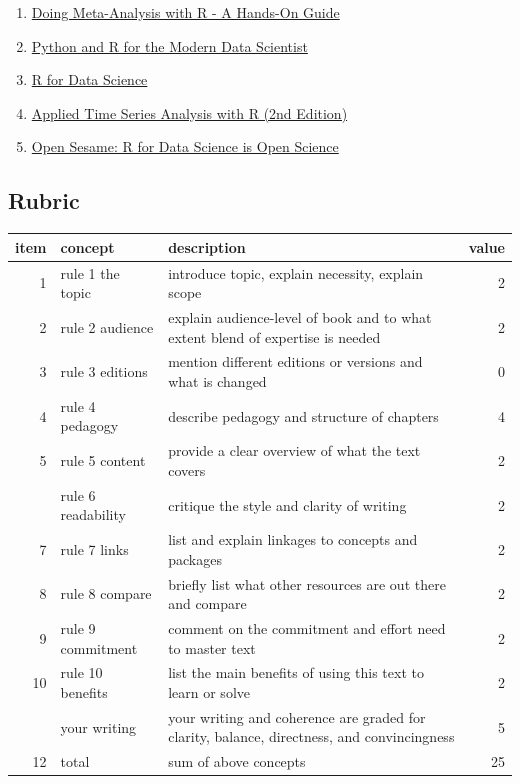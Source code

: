 \documentclass[
]{book}
\begin{document}
\begin{enumerate}
\def\labelenumi{\arabic{enumi}.}
\item
  \href{https://www.jstatsoft.org/article/view/v102b02}{Doing Meta-Analysis with R - A Hands-On Guide}
\item
  \href{https://www.jstatsoft.org/article/view/v103b02}{Python and R for the Modern Data Scientist}
\item
  \href{https://www.jstatsoft.org/article/view/v077b01}{R for Data Science}
\item
  \href{https://www.jstatsoft.org/article/view/v085b03}{Applied Time Series Analysis with R (2nd Edition)}
\item
  \href{https://ojs.library.queensu.ca/index.php/IEE/article/view/6559}{Open Sesame: R for Data Science is Open Science}
\end{enumerate}

\hypertarget{rubric}{%
\subsection*{Rubric}\label{rubric}}

\begin{tabular}{rllr}
\toprule
item & concept & description & value\\
\midrule
1 & rule 1 the topic & introduce topic, explain necessity, explain scope & 2\\
2 & rule 2 audience & explain audience-level of book and to what extent blend of expertise is needed & 2\\
3 & rule 3 editions & mention different editions or versions and what is changed & 0\\
4 & rule 4 pedagogy & describe pedagogy and structure of chapters & 4\\
5 & rule 5 content & provide a clear overview of what the text covers & 2\\
\addlinespace
6 & rule 6 readability & critique the style and clarity of writing & 2\\
7 & rule 7 links & list and explain linkages to concepts and packages & 2\\
8 & rule 8 compare & briefly list what other resources are out there and compare & 2\\
9 & rule 9 commitment & comment on the commitment and effort need to master text & 2\\
10 & rule 10 benefits & list the main benefits of using this text to learn or solve & 2\\
\addlinespace
11 & your writing & your writing and coherence are graded for clarity, balance, directness, and convincingness & 5\\
12 & total & sum of above concepts & 25\\
\bottomrule
\end{tabular}
\end{document}
